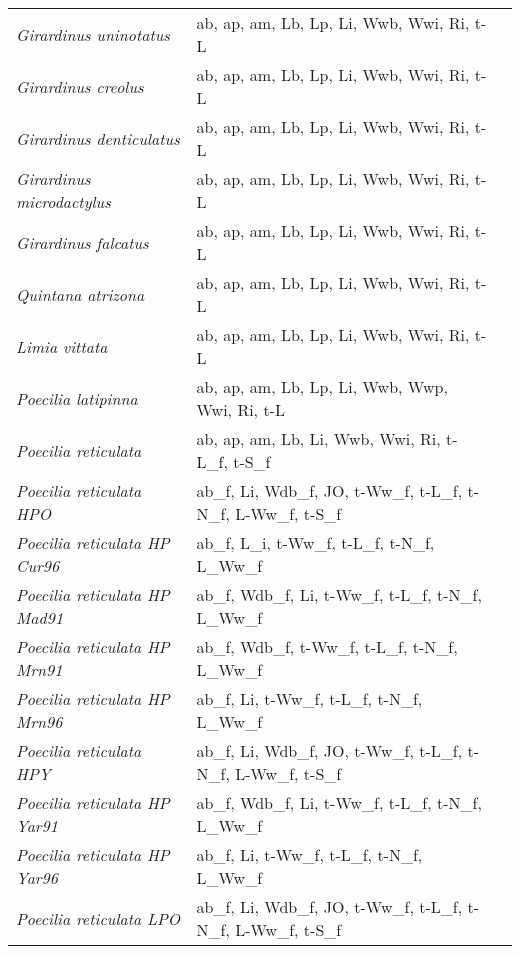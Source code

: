 {\begin{longtable}[c]{p{3.5cm}p{5.5cm}p{5.5cm}}
\emph{Girardinus uninotatus} &  ab, ap, am, Lb, Lp, Li, Wwb, Wwi, Ri, t-L & \citet{PoncRodr2013} \\
\emph{Girardinus creolus} &  ab, ap, am, Lb, Lp, Li, Wwb, Wwi, Ri, t-L & \citet{PoncRodr2013} \\
\emph{Girardinus denticulatus} &  ab, ap, am, Lb, Lp, Li, Wwb, Wwi, Ri, t-L & \citet{PoncRodr2013} \\
\emph{Girardinus microdactylus} &  ab, ap, am, Lb, Lp, Li, Wwb, Wwi, Ri, t-L & \citet{PoncRodr2013} \\
\emph{Girardinus falcatus} &  ab, ap, am, Lb, Lp, Li, Wwb, Wwi, Ri, t-L & \citet{PoncRodr2013} \\
\emph{Quintana atrizona} &  ab, ap, am, Lb, Lp, Li, Wwb, Wwi, Ri, t-L & \citet{PoncRodr2013} \\
\emph{Limia vittata} &  ab, ap, am, Lb, Lp, Li, Wwb, Wwi, Ri, t-L & \citet{PoncRodr2013} \\
\emph{Poecilia latipinna} &  ab, ap, am, Lb, Lp, Li, Wwb, Wwp, Wwi, Ri, t-L & \citet{TravFarr1989,MoshEagd2015} \\
\emph{Poecilia reticulata} &  ab, ap, am, Lb, Li, Wwb, Wwi, Ri, t-L\_f, t-S\_f & \citet{GarcTron2008,Comf1983,Ursi1967} \\
\emph{Poecilia reticulata HPO} &  ab\_f, Li, Wdb\_f, JO, t-Ww\_f, t-L\_f, t-N\_f, L-Ww\_f, t-S\_f & \citet{ReznBrya2004,AuerDick2018} \\
\emph{Poecilia reticulata HP Cur96} &  ab\_f, L\_i, t-Ww\_f, t-L\_f, t-N\_f, L\_Ww\_f & \citet{Rezn1996} \\
\emph{Poecilia reticulata HP Mad91} &  ab\_f, Wdb\_f, Li, t-Ww\_f, t-L\_f, t-N\_f, L\_Ww\_f & \citet{ReznBrya1996} \\
\emph{Poecilia reticulata HP Mrn91} &  ab\_f, Wdb\_f, t-Ww\_f, t-L\_f, t-N\_f, L\_Ww\_f & \citet{ReznBrya1996} \\
\emph{Poecilia reticulata HP Mrn96} &  ab\_f, Li, t-Ww\_f, t-L\_f, t-N\_f, L\_Ww\_f & \citet{Rezn1996} \\
\emph{Poecilia reticulata HPY} &  ab\_f, Li, Wdb\_f, JO, t-Ww\_f, t-L\_f, t-N\_f, L-Ww\_f, t-S\_f & \citet{ReznBrya2004,AuerDick2018} \\
\emph{Poecilia reticulata HP Yar91} &  ab\_f, Wdb\_f, Li, t-Ww\_f, t-L\_f, t-N\_f, L\_Ww\_f & \citet{ReznBrya1996} \\
\emph{Poecilia reticulata HP Yar96} &  ab\_f, Li, t-Ww\_f, t-L\_f, t-N\_f, L\_Ww\_f & \citet{Rezn1996} \\
\emph{Poecilia reticulata LPO} &  ab\_f, Li, Wdb\_f, JO, t-Ww\_f, t-L\_f, t-N\_f, L-Ww\_f, t-S\_f & \citet{ReznBrya2004,AuerDick2018} \\

\end{longtable}}
